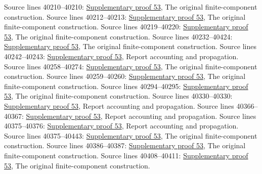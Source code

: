 \begin{AlgebraSourceRoutes}
 Source lines 40210--40210: \hyperlink{algebra_etale_quasifinite_notes_20260928}{Supplementary proof 53}, The original finite-component construction.
 Source lines 40212--40213: \hyperlink{algebra_etale_quasifinite_notes_20260928}{Supplementary proof 53}, The original finite-component construction.
 Source lines 40219--40220: \hyperlink{algebra_etale_quasifinite_notes_20260928}{Supplementary proof 53}, The original finite-component construction.
 Source lines 40232--40424: \hyperlink{algebra_etale_quasifinite_notes_20260928}{Supplementary proof 53}, The original finite-component construction.
 Source lines 40242--40243: \hyperlink{algebra_etale_quasifinite_notes_20260928}{Supplementary proof 53}, Report accounting and propagation.
 Source lines 40258--40274: \hyperlink{algebra_etale_quasifinite_notes_20260928}{Supplementary proof 53}, The original finite-component construction.
 Source lines 40259--40260: \hyperlink{algebra_etale_quasifinite_notes_20260928}{Supplementary proof 53}, The original finite-component construction.
 Source lines 40294--40295: \hyperlink{algebra_etale_quasifinite_notes_20260928}{Supplementary proof 53}, The original finite-component construction.
 Source lines 40330--40330: \hyperlink{algebra_etale_quasifinite_notes_20260928}{Supplementary proof 53}, Report accounting and propagation.
 Source lines 40366--40367: \hyperlink{algebra_etale_quasifinite_notes_20260928}{Supplementary proof 53}, Report accounting and propagation.
 Source lines 40375--40376: \hyperlink{algebra_etale_quasifinite_notes_20260928}{Supplementary proof 53}, Report accounting and propagation.
 Source lines 40375--40443: \hyperlink{algebra_etale_quasifinite_notes_20260928}{Supplementary proof 53}, The original finite-component construction.
 Source lines 40386--40387: \hyperlink{algebra_etale_quasifinite_notes_20260928}{Supplementary proof 53}, The original finite-component construction.
 Source lines 40408--40411: \hyperlink{algebra_etale_quasifinite_notes_20260928}{Supplementary proof 53}, The original finite-component construction.

\end{AlgebraSourceRoutes}
